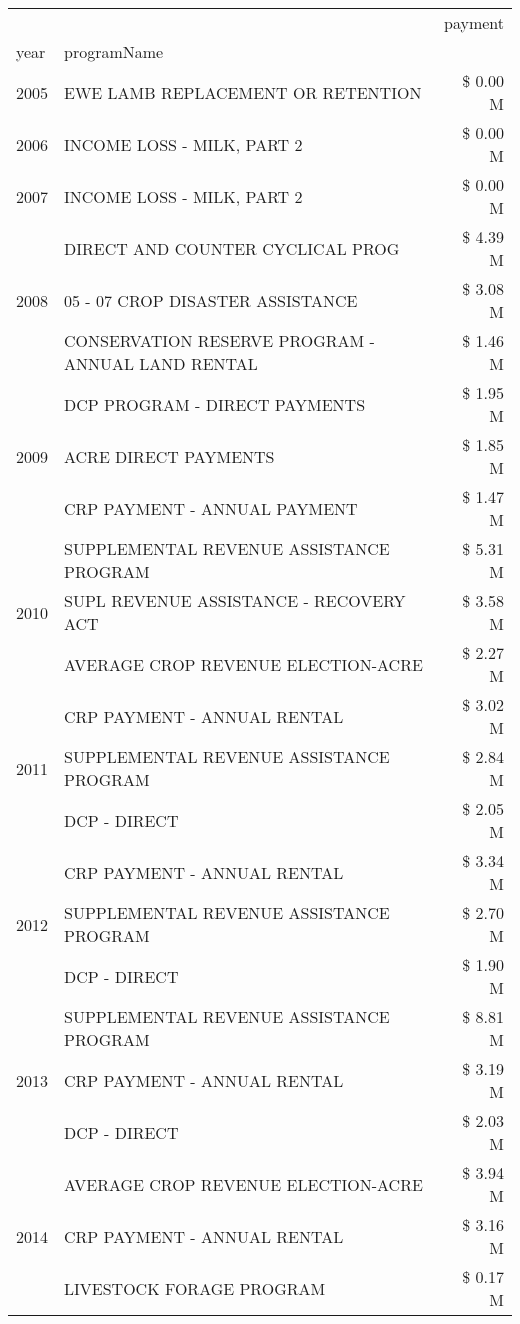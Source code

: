 \begin{tabular}{llr}
\toprule
 &  & payment \\
year & programName &  \\
\midrule
2005 & EWE LAMB REPLACEMENT OR RETENTION & \$ 0.00 M \\
\cline{1-3}
2006 & INCOME LOSS - MILK, PART 2 & \$ 0.00 M \\
\cline{1-3}
2007 & INCOME LOSS - MILK, PART 2 & \$ 0.00 M \\
\cline{1-3}
\multirow[t]{3}{*}{2008} & DIRECT AND COUNTER CYCLICAL PROG & \$ 4.39 M \\
 & 05 - 07 CROP DISASTER ASSISTANCE & \$ 3.08 M \\
 & CONSERVATION RESERVE PROGRAM - ANNUAL LAND RENTAL & \$ 1.46 M \\
\cline{1-3}
\multirow[t]{3}{*}{2009} & DCP PROGRAM - DIRECT PAYMENTS & \$ 1.95 M \\
 & ACRE DIRECT PAYMENTS & \$ 1.85 M \\
 & CRP PAYMENT - ANNUAL PAYMENT & \$ 1.47 M \\
\cline{1-3}
\multirow[t]{3}{*}{2010} & SUPPLEMENTAL REVENUE ASSISTANCE PROGRAM & \$ 5.31 M \\
 & SUPL REVENUE ASSISTANCE - RECOVERY ACT & \$ 3.58 M \\
 & AVERAGE CROP REVENUE ELECTION-ACRE & \$ 2.27 M \\
\cline{1-3}
\multirow[t]{3}{*}{2011} & CRP PAYMENT - ANNUAL RENTAL & \$ 3.02 M \\
 & SUPPLEMENTAL REVENUE ASSISTANCE PROGRAM & \$ 2.84 M \\
 & DCP - DIRECT & \$ 2.05 M \\
\cline{1-3}
\multirow[t]{3}{*}{2012} & CRP PAYMENT - ANNUAL RENTAL & \$ 3.34 M \\
 & SUPPLEMENTAL REVENUE ASSISTANCE PROGRAM & \$ 2.70 M \\
 & DCP - DIRECT & \$ 1.90 M \\
\cline{1-3}
\multirow[t]{3}{*}{2013} & SUPPLEMENTAL REVENUE ASSISTANCE PROGRAM & \$ 8.81 M \\
 & CRP PAYMENT - ANNUAL RENTAL & \$ 3.19 M \\
 & DCP - DIRECT & \$ 2.03 M \\
\cline{1-3}
\multirow[t]{3}{*}{2014} & AVERAGE CROP REVENUE ELECTION-ACRE & \$ 3.94 M \\
 & CRP PAYMENT - ANNUAL RENTAL & \$ 3.16 M \\
 & LIVESTOCK FORAGE PROGRAM & \$ 0.17 M \\

\end{tabular}
